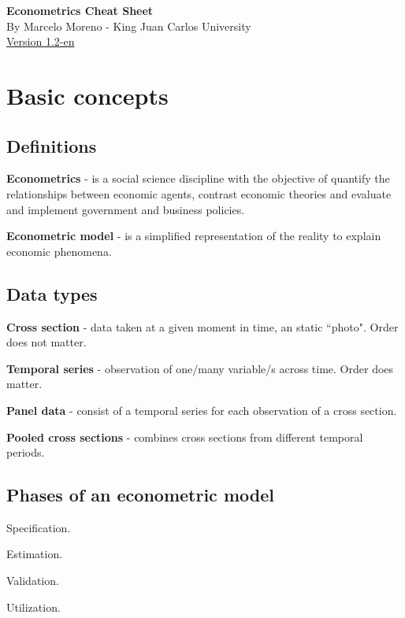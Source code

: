 \documentclass[10pt, a4paper, landscape]{extarticle}
\begin{document}
\begin{multicols}{3} %

\begin{center}
\textbf{\LARGE Econometrics Cheat Sheet} \\ {\footnotesize By Marcelo Moreno - King Juan Carlos University} \\ {\footnotesize \href{https://github.com/marcelomijas/econometrics-cheatsheet}{Version 1.2-en}}
\end{center}

\section*{Basic concepts}
\subsection*{Definitions}

\textbf{Econometrics} - is a social science discipline with the objective of quantify the relationships between economic agents, contrast economic theories and evaluate and implement government and business policies.

\textbf{Econometric model} - is a simplified representation of the reality to explain economic phenomena.

\subsection*{Data types}

\textbf{Cross section} - data taken at a given moment in time, an static ``photo". Order does not matter.

\textbf{Temporal series} - observation of one/many variable/s across time. Order does matter.

\textbf{Panel data} - consist of a temporal series for each observation of a cross section.

\textbf{Pooled cross sections} - combines cross sections from different temporal periods.

\subsection*{Phases of an econometric model}

\begin{enumerate}[leftmargin=*]
\setlength{\multicolsep}{0pt}
\begin{multicols}{2}
\item Specification.
\item Estimation.
\columnbreak
\item Validation.
\item Utilization.
\end{multicols}
\end{enumerate}


\end{multicols}
\end{document}
